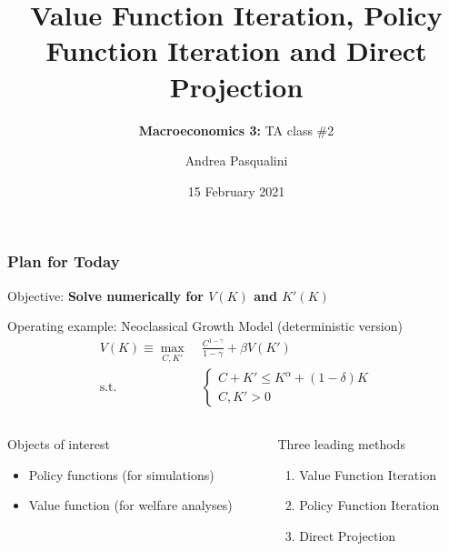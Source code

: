 \documentclass[10pt, aspectratio=1610, handout]{beamer}
\title[VFI, PFI and DP]{
  \textbf{Value Function Iteration, Policy Function Iteration and Direct Projection}
}
\subtitle[Macro 3: TA\#1]{
  \textbf{Macroeconomics 3:} TA class \#2
}
\author[A.~Pasqualini]{
  Andrea Pasqualini
}
\institute[Bocconi]{Bocconi University}
\date{
  15 February 2021
}
\begin{document}
  \begin{frame}
    \maketitle
  \end{frame}

  \begin{frame}
    \frametitle{Plan for Today}

    Objective: \textbf{Solve numerically for $V(K)$ and $K'(K)$}

    \vfill\pause

    Operating example: Neoclassical Growth Model (deterministic version)
    \begin{align*}
      V(K) \equiv \max_{C, K'} &\; \frac{C^{1 - \gamma}}{1 - \gamma} + \beta V(K') \\
      \text{s.t.} &\;
      \begin{cases}
        C + K' \leq K^\alpha + (1 - \delta) K \\
        C, K' > 0
      \end{cases}
    \end{align*}

    \vfill\pause

    \begin{columns}[T]
      \begin{column}{0.45\textwidth}
        Objects of interest
        \begin{itemize}
          \item Policy functions (for simulations)
          \item Value function (for welfare analyses)
        \end{itemize}
      \end{column}
      \begin{column}{0.35\textwidth}
        Three leading methods
        \begin{enumerate}
          \item Value Function Iteration
          \item Policy Function Iteration
          \item Direct Projection
        \end{enumerate}
      \end{column}
    \end{columns}

  \end{frame}
\end{document}
